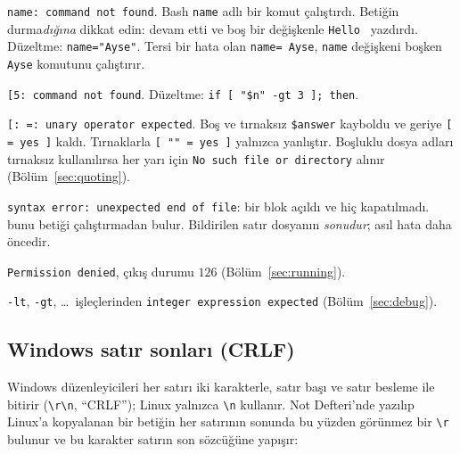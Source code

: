 

\begin{description}[leftmargin=0pt,itemsep=0.3em]
  \item[\texttt{=} çevresinde boşluk] \texttt{name: command not found}. Bash \texttt{name} adlı bir komut çalıştırdı. Betiğin durma\emph{dığına} dikkat edin: devam etti ve boş bir değişkenle \texttt{Hello } yazdırdı. Düzeltme: \texttt{name="Ayse"}. Tersi bir hata olan \texttt{name= Ayse}, \texttt{name} değişkeni boşken \texttt{Ayse} komutunu çalıştırır.
  \item[\texttt{[ ]} içinde boşluk yok] \texttt{[5: command not found}. Düzeltme: \texttt{if [ "\$n" -gt 3 ]; then}.
  \item[Eksik tırnaklar] \texttt{[: =: unary operator expected}. Boş ve tırnaksız \texttt{\$answer} kayboldu ve geriye \texttt{[ = yes ]} kaldı. Tırnaklarla \texttt{[ "" = yes ]} yalnızca yanlıştır. Boşluklu dosya adları tırnaksız kullanılırsa her yarı için \texttt{No such file or directory} alınır (Bölüm~\ref{sec:quoting}).
  \item[Eksik \texttt{fi}, \texttt{done} ya da tırnak] \texttt{syntax error: unexpected end of file}: bir blok açıldı ve hiç kapatılmadı.  bunu betiği çalıştırmadan bulur. Bildirilen satır dosyanın \emph{sonudur}; asıl hata daha öncedir.
  \item[Eksik \texttt{chmod +x}] \texttt{Permission denied}, çıkış durumu $126$ (Bölüm~\ref{sec:running}).
  \item[Sayı değil] \texttt{-lt}, \texttt{-gt}, \ldots\ işleçlerinden \texttt{integer expression expected} (Bölüm~\ref{sec:debug}).
\end{description}

\subsection{Windows satır sonları (CRLF)}

Windows düzenleyicileri her satırı iki karakterle, satır başı ve satır besleme ile bitirir (\texttt{\textbackslash r\textbackslash n}, “CRLF”); Linux yalnızca \texttt{\textbackslash n} kullanır. Not Defteri'nde yazılıp Linux'a kopyalanan bir betiğin her satırının sonunda bu yüzden görünmez bir \texttt{\textbackslash r} bulunur ve bu karakter satırın son sözcüğüne yapışır:



